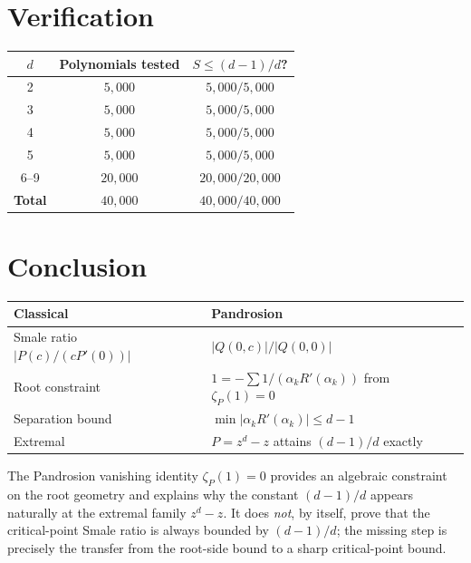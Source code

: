 \documentclass[11pt,a4paper]{article}
\begin{document}
\section{Verification}

\begin{center}
\begin{tabular}{ccc}
\toprule
$d$ & Polynomials tested & $S \le (d - 1)/d$? \\
\midrule
2     & $5{,}000$  & $5{,}000/5{,}000$ \\
3     & $5{,}000$  & $5{,}000/5{,}000$ \\
4     & $5{,}000$  & $5{,}000/5{,}000$ \\
5     & $5{,}000$  & $5{,}000/5{,}000$ \\
6--9  & $20{,}000$ & $20{,}000/20{,}000$ \\
\midrule
\textbf{Total} & $40{,}000$ & $40{,}000/40{,}000$ \\
\bottomrule
\end{tabular}
\end{center}

\section{Conclusion}

\begin{center}
\begin{tabular}{ll}
\toprule
\textbf{Classical}                  & \textbf{Pandrosion} \\
\midrule
Smale ratio $|P(c)/(c P'(0))|$       & $|Q(0, c)|/|Q(0, 0)|$ \\
Root constraint                      & $1 = -\sum 1/(\alpha_k R'(\alpha_k))$ from $\zeta_P(1) = 0$ \\
Separation bound                     & $\min |\alpha_k R'(\alpha_k)| \le d - 1$ \\
Extremal                             & $P = z^d - z$ attains $(d - 1)/d$ exactly \\
\bottomrule
\end{tabular}
\end{center}

The Pandrosion vanishing identity $\zeta_P(1) = 0$ provides an algebraic constraint on the root geometry and explains why the constant $(d - 1)/d$ appears naturally at the extremal family $z^d-z$. It does \emph{not}, by itself, prove that the critical-point Smale ratio is always bounded by $(d - 1)/d$; the missing step is precisely the transfer from the root-side bound to a sharp critical-point bound.
\end{document}
